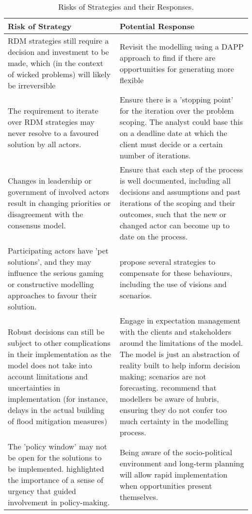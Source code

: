 \begin{table}[h!]
\caption{Risks of Strategies and their Responses.}
\label{tab:pr-risks-and-responses}
\centering
\begin{tabular}{p{}|p{}}
\hline
Risk of Strategy &
  Potential Response \\ \hline
RDM strategies still require a decision and investment to be made, which (in the context of wicked problems) will likely be irreversible &
  Revisit the modelling using a DAPP approach to find if there are opportunities for generating more flexible \\ \hline
The requirement to iterate over RDM strategies may never resolve to a favoured solution by all actors. &
  Ensure there is a 'stopping point' for the iteration over the problem scoping. The analyst could base this on a deadline date at which the client must decide or a certain number of iterations. \\ \hline
Changes in leadership or government of involved actors result in changing priorities or disagreement with the consensus model. &
  Ensure that each step of the process is well documented, including all decisions and assumptions and past iterations of the scoping and their outcomes, such that the new or changed actor can become up to date on the process. \\ \hline
Participating actors have 'pet solutions', and they may influence the serious gaming or constructive modelling approaches to favour their solution. &
  \citeauthor{pot_what_2018} propose several strategies to compensate for these behaviours, including the use of visions and scenarios. \\ \hline
Robust decisions can still be subject to other complications in their implementation as the model does not take into account limitations and uncertainties in implementation (for instance, delays in the actual building of flood mitigation measures) &
  Engage in expectation management with the clients and stakeholders around the limitations of the model. The model is just an abstraction of reality built to help inform decision making; scenarios are not forecasting. \cite{saltelli_five_2020} recommend that modellers be aware of hubris, ensuring they do not confer too much certainty in the modelling process. \\ \hline
The 'policy window' may not be open for the solutions to be implemented. \cite{rijke_room_2012} highlighted the importance of a sense of urgency that guided involvement in policy-making. & Being aware of the socio-political environment and long-term planning will allow rapid implementation when opportunities present themselves.

\end{tabular}
\end{table}
